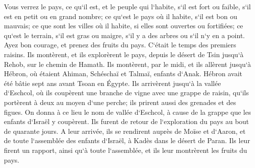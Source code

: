 \verse Vous verrez le pays, ce qu`il est, et le peuple qui l`habite, s`il est fort ou faible, s`il est en petit ou en grand nombre; 
\verse ce qu`est le pays où il habite, s`il est bon ou mauvais; ce que sont les villes où il habite, si elles sont ouvertes ou fortifiées; 
\verse ce qu`est le terrain, s`il est gras ou maigre, s`il y a des arbres ou s`il n`y en a point. Ayez bon courage, et prenez des fruits du pays. C`était le temps des premiers raisins. 
\verse Ils montèrent, et ils explorèrent le pays, depuis le désert de Tsin jusqu`à Rehob, sur le chemin de Hamath. 
\verse Ils montèrent, par le midi, et ils allèrent jusqu`à Hébron, où étaient Ahiman, Schéschaï et Talmaï, enfants d`Anak. Hébron avait été bâtie sept ans avant Tsoan en Égypte. 
\verse Ils arrivèrent jusqu`à la vallée d`Eschcol, où ils coupèrent une branche de vigne avec une grappe de raisin, qu`ils portèrent à deux au moyen d`une perche; ils prirent aussi des grenades et des figues. 
\verse On donna à ce lieu le nom de vallée d`Eschcol, à cause de la grappe que les enfants d`Israël y coupèrent. 
\verse Ils furent de retour de l`exploration du pays au bout de quarante jours. 
\verse A leur arrivée, ils se rendirent auprès de Moïse et d`Aaron, et de toute l`assemblée des enfants d`Israël, à Kadès dans le désert de Paran. Ils leur firent un rapport, ainsi qu`à toute l`assemblée, et ils leur montrèrent les fruits du pays. 
